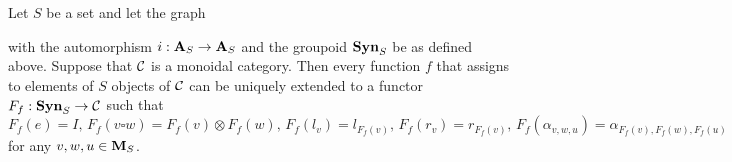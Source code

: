 \begin{proposition}\label{proposition:syntactictensorcategory}
Let $S$ be a set and let the graph
\begin{center}
\end{center}
with the automorphism $i:\mathbf{A}_S\rightarrow \mathbf{A}_S$ and the groupoid  $\mathbf{Syn}_{S}$ be as defined above. Suppose that ${\mathcal C}$ is a monoidal category. Then every function $f$ that assigns to elements of $S$ objects of ${\mathcal C}$ can be uniquely extended to a functor $F_f:\mathbf{Syn}_{S} \rightarrow {\mathcal C}$ such that 
$$F_f(e) = I,\,F_f(v\square w) = F_f(v)\otimes F_f(w),\,F_f(l_v) = l_{F_f(v)},\,F_f(r_v) = r_{F_f(v)},\,F_f(\alpha_{v,w,u}) = \alpha_{F_f(v),F_f(w),F_f(u)}$$
for any $v,w,u\in \mathbf{M}_S$.
\end{proposition} 
